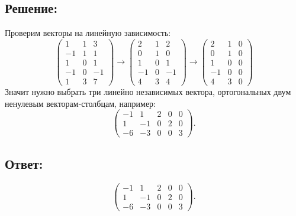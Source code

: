 \documentclass[12pt]{article}
\begin{document}
    \subsection*{Решение:}
    Проверим векторы на линейную зависимость:
    \[
        \begin{pmatrix}
            1  & 1 & 3  \\
            -1 & 1 & 1  \\
            1  & 0 & 1  \\
            -1 & 0 & -1 \\
            1  & 3 & 7
        \end{pmatrix}
        \rightarrow
        \begin{pmatrix}
            2  & 1 & 2  \\
            0  & 1 & 0  \\
            1  & 0 & 1  \\
            -1 & 0 & -1 \\
            4  & 3 & 4
        \end{pmatrix}
        \rightarrow
        \begin{pmatrix}
            2  & 1 & 0 \\
            0  & 1 & 0 \\
            1  & 0 & 0 \\
            -1 & 0 & 0 \\
            4  & 3 & 0
        \end{pmatrix}
    \]
    Значит нужно выбрать три линейно независимых вектора, ортогональных двум ненулевым векторам-столбцам, например:
    \[
        \begin{pmatrix}
            -1 & 1  & 2 & 0 & 0 \\
            1  & -1 & 0 & 2 & 0 \\
            -6 & -3 & 0 & 0 & 3
        \end{pmatrix}
        .
    \]

    \subsection*{Ответ:}
    \[
        \begin{pmatrix}
            -1 & 1  & 2 & 0 & 0 \\
            1  & -1 & 0 & 2 & 0 \\
            -6 & -3 & 0 & 0 & 3
        \end{pmatrix}
        .
    \]
\end{document}
